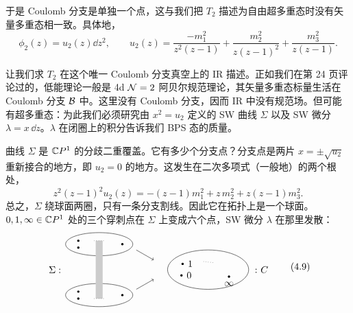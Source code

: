 于是 Coulomb 分支是单独一个点，这与我们把 $T_2$ 描述为自由超多重态时没有矢量多重态相一致。具体地，
\begin{equation}
  \phi_2(z)=u_2(z)\dd z^2,
  \qquad
  u_2(z)=\frac{-m_1^2}{z^2(z-1)}+\frac{m_2^2}{z(z-1)^2}+\frac{m_3^2}{z(z-1)}.
  \tag{4.7}
\end{equation}


让我们求 $T_2$ 在这个唯一 Coulomb 分支真空上的 IR 描述。正如我们在第 24 页评论过的，低能理论一般是 4d $\mathcal{N}=2$ 阿贝尔规范理论，其矢量多重态标量生活在 Coulomb 分支 $\mathcal{B}$ 中。这里没有 Coulomb 分支，因而 IR 中没有规范场。但可能有超多重态：为此我们必须研究由 $x^2=u_2$ 定义的 SW 曲线 $\Sigma$ 以及 SW 微分 $\lambda=x\,\dd z$。$\lambda$ 在闭圈上的积分告诉我们 BPS 态的质量。

曲线 $\Sigma$ 是 $\mathbb{C} P^1$ 的分歧二重覆盖。它有多少个分支点？分支点是两片 $x=\pm\sqrt{u_2}$ 重新接合的地方，即 $u_2=0$ 的地方。这发生在二次多项式（一般地）的两个根处，
\begin{equation}
  z^2(z-1)^2u_2(z)=-(z-1)m_1^2+z\,m_2^2+z(z-1)m_3^2.
  \tag{4.8}
\end{equation}
总之，$\Sigma$ 绕球面两圈，只有一条分支割线。因此它在拓扑上是一个球面。$0,1,\infty\in\mathbb{C} P^1$ 处的三个穿刺点在 $\Sigma$ 上变成六个点，SW 微分 $\lambda$ 在那里发散：
\begin{equation}
\begin{tikzpicture}[scale=0.85,baseline=(current bounding box.center)]
  \draw (1.6,1.1) ellipse (1.45 and 0.5);
  \fill (0.7,1.25) circle (0.05);
  \fill (0.7,0.95) circle (0.05);
  \fill (2.6,1.1) circle (0.05);
  \draw (1.6,-1.1) ellipse (1.45 and 0.5);
  \fill (0.7,-0.95) circle (0.05);
  \fill (0.7,-1.25) circle (0.05);
  \fill (2.6,-1.1) circle (0.05);
  \draw[fill=gray!40,draw=none] (1.45,-1.25) rectangle (1.75,1.25);
  \draw[dotted] (1.38,1.25)--(1.82,1.25);
  \draw[dotted] (1.38,-1.25)--(1.82,-1.25);
  \node[left] at (0.1,0) {$\Sigma:$};
  \draw[->] (3.2,0.85)--(3.95,0.42);
  \draw[->] (3.2,-0.85)--(3.95,-0.42);
  \draw (6.3,0) ellipse (1.75 and 0.85);
  \fill (5.2,0.25) circle (0.05);
  \node[right] at (5.28,0.25) {$1$};
  \fill (5.15,-0.25) circle (0.05);
  \node[right] at (5.23,-0.25) {$0$};
  \fill (7.2,-0.3) circle (0.05);
  \node[below] at (7.2,-0.38) {$\infty$};
  \draw[dotted] (6.1,0.35)--(6.55,0.3);
  \node[right] at (8.12,0) {$\colon C$};
\end{tikzpicture}
\tag{4.9}
\end{equation}

